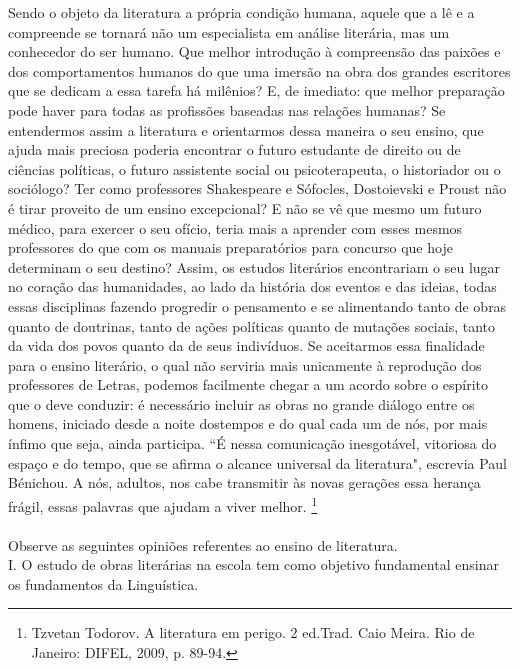 \documentclass[10pt,a4paper]{article}
\begin{document}
\begin{multicols}{2}
\begin{enumerate}
	Sendo o objeto da literatura a pr\'opria condi\c{c}\~ao humana, aquele que a l\^e e a compreende se tornar\'a n\~ao um especialista em an\'alise liter\'aria, mas um conhecedor do ser humano. Que melhor introdu\c{c}\~ao \`a compreens\~ao das paix\~oes e dos comportamentos humanos do que uma imers\~ao na obra dos grandes escritores que se dedicam a essa tarefa h\'a mil\^enios? E, de imediato: que melhor prepara\c{c}\~ao pode haver para todas as profiss\~oes baseadas nas rela\c{c}\~oes humanas? Se entendermos assim a literatura e orientarmos dessa maneira o seu ensino, que ajuda mais preciosa poderia encontrar o futuro estudante de direito ou de ci\^encias pol\'iticas, o futuro assistente social ou psicoterapeuta, o historiador ou o soci\'ologo? Ter como professores Shakespeare e S\'ofocles, Dostoievski e Proust n\~ao \'e tirar proveito de um ensino excepcional? E n\~ao se v\^e que mesmo um futuro m\'edico, para exercer o seu of\'icio, teria mais a aprender com esses mesmos professores do que com os manuais preparat\'orios para concurso que hoje determinam o seu destino? Assim, os estudos liter\'arios encontrariam o seu lugar no cora\c{c}\~ao das humanidades, ao lado da hist\'oria dos eventos e das ideias, todas essas disciplinas fazendo progredir o pensamento e se alimentando tanto de obras quanto de doutrinas, tanto de a\c{c}\~oes pol\'iticas quanto de muta\c{c}\~oes sociais, tanto da vida dos povos quanto da de seus indiv\'iduos. Se aceitarmos essa finalidade para o ensino liter\'ario, o qual n\~ao serviria mais unicamente \`a reprodu\c{c}\~ao dos professores de Letras, podemos facilmente chegar a um acordo sobre o esp\'irito que o deve conduzir: \'e necess\'ario incluir as obras no grande di\'alogo entre os homens, iniciado desde a noite dostempos e do qual cada um de n\'os, por mais \'infimo que seja, ainda participa. ``\'E nessa comunica\c{c}\~ao inesgot\'avel, vitoriosa do espa\c{c}o e do tempo, que se afirma o alcance universal da literatura", escrevia Paul B\'enichou. A n\'os, adultos, nos cabe transmitir \`as novas gera\c{c}\~oes essa heran\c{c}a fr\'agil, essas palavras que ajudam a viver melhor. \footnote{Tzvetan Todorov. A literatura em perigo. 2 ed.Trad. Caio Meira. Rio de Janeiro: DIFEL, 2009, p. 89-94.} \\
	\\
	Observe as seguintes opini\~oes referentes ao ensino de literatura.\\
	I. O estudo de obras liter\'arias na escola tem como objetivo fundamental ensinar os fundamentos da Lingu\'istica.\\

\end{enumerate}
\end{multicols}
\end{document}
